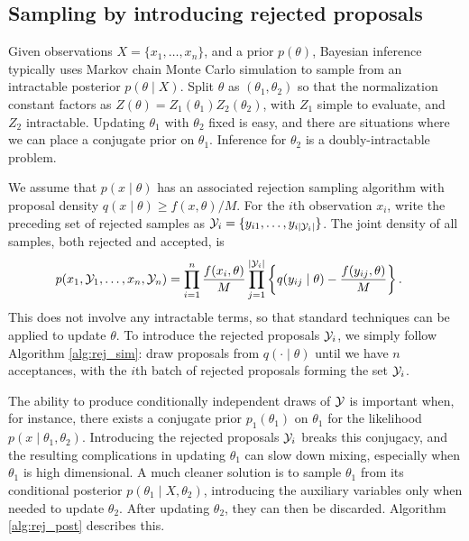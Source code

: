 \subsection{Sampling by introducing rejected proposals}  \label{sec:latent_hist}
Given observations $X = \{x_1, \ldots, x_n\}$, and a prior $p(\theta)$, Bayesian inference typically uses Markov chain Monte Carlo simulation
to sample from an intractable posterior $p(\theta\mid X)$. 
Split $\theta$ as $(\theta_1, \theta_2)$ so that
the normalization constant factors as $Z(\theta) = Z_1(\theta_1) Z_2(\theta_2)$,
with $Z_1$ simple to evaluate, and $Z_2$ intractable.
Updating $\theta_1$ with $\theta_2$ fixed is easy, and there are situations where we can place a conjugate
prior on $\theta_1$. %
Inference for $\theta_2$ is a doubly-intractable problem. %



We assume that $p(x\mid\theta)$ has an associated rejection sampling algorithm with proposal density 
$q(x\mid\theta) \ge f(x,\theta)/M$. 
For the $i${th} observation $x_i$, write the preceding set of
rejected samples as $\mathcal{Y}_i = \{y_{i1}, \ldots, y_{i{|\mathcal{Y}_i|}}\}$.
The joint density of all samples, both rejected and accepted, is 
\begin{align*}
 p(x_1, \cY_1,\ldots, x_n, \cY_n) &= \prod_{i=1}^n \frac{f(x_i, \theta)}{M} 
 \prod_{j=1}^{|\mathcal{Y}_i|}  \left\{q(y_{ij}\mid\theta) - \frac{f(y_{ij}, \theta)}{M}\right\}. %
\end{align*}
This does not involve any intractable terms, so that standard techniques can be applied to update $\theta$. To introduce the
rejected proposals $\mathcal{Y}_i$, we simply follow Algorithm \ref{alg:rej_sim}: draw proposals from $q(\cdot\mid\theta)$ until we have $n$ acceptances, 
with the $i${th} batch of rejected proposals forming the set $\mathcal{Y}_i$.

The ability to produce conditionally independent draws of $\mathcal{Y}$ is important when, %
for instance, there exists a conjugate prior $p_1(\theta_1)$ on $\theta_1$ for the likelihood 
$p(x\mid\theta_1,\theta_2)$. Introducing the rejected proposals $\mathcal{Y}_i$
breaks this conjugacy, and the resulting complications in updating $\theta_1$ can slow down mixing, especially when $\theta_1$ is
high dimensional.
A much cleaner solution is to sample $\theta_1$ from its conditional posterior $p(\theta_1\mid X,\theta_2)$, introducing the
auxiliary variables only when needed to update $\theta_2$. After updating $\theta_2$, they can then be discarded.
Algorithm \ref{alg:rej_post} describes this.

